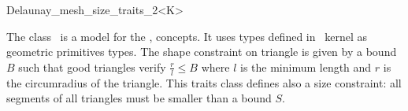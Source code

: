 \begin{ccRefClass}{Delaunay_mesh_size_traits_2<K>}

\ccDefinition
  
The class \ccRefName\ is a model for the ,
concepts. It uses types defined in \cgal\ kernel as geometric primitives
types. The shape constraint on triangle is given by a bound $B$ such that
good triangles verify $\frac{r}{l} \le B$ where $l$ is the minimum length
and $r$ is the circumradius of the triangle. This traits class defines also
a size constraint: all segments of all triangles must be smaller than a
bound $S$.


\ccIsModel


\ccCreation
{}

\end{ccRefClass}


